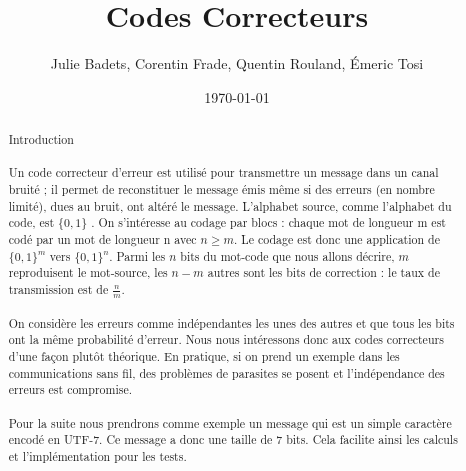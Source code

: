 \documentclass[a4paper,11pt]{report}
\title{Codes Correcteurs}
\author{Julie Badets, Corentin Frade, Quentin Rouland, Émeric Tosi}
\date{\today}
\begin{document}
    \maketitle{}


    \begin{abstract}
        \paragraph{}
Introduction
        \paragraph{}
Un code correcteur d'erreur est utilisé pour transmettre un message dans un canal bruité ;
il permet de reconstituer le message émis même si des erreurs (en nombre limité), dues au bruit, ont altéré le message.
L'alphabet source, comme l'alphabet du code, est $\{0,1\}$ .
On s'intéresse au codage par blocs : chaque mot de longueur m est codé par un mot de longueur n avec $n \geq m$.
Le codage est donc une application de $\{0,1\}^m$  vers $\{0,1\}^n$.
Parmi les $n$ bits du mot-code que nous allons décrire, $m$ reproduisent le mot-source,
les $n-m$ autres sont les bits de correction : le taux de transmission est de $\frac{n}{m}$.
        \paragraph{}
On considère les erreurs comme indépendantes les unes des autres et que tous les bits ont la même probabilité d'erreur.
Nous nous intéressons donc aux codes correcteurs d'une façon plutôt théorique.
En pratique, si on prend un exemple dans les communications sans fil, des problèmes de parasites se posent et l'indépendance des erreurs est compromise.
        \paragraph{}
Pour la suite nous prendrons comme exemple un message qui est un simple caractère encodé en UTF-7.
Ce message a donc une taille de 7 bits.
Cela facilite ainsi les calculs et l'implémentation pour les tests.
    \end{abstract}


    \setcounter{tocdepth}{1}

    \renewcommand{\contentsname}{Sommaire}

    \tableofcontents{}

    

    

    

    

    

    

    \listoffigures
\end{document}
